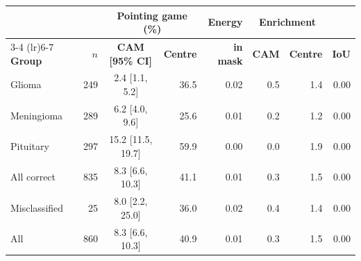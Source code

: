 \begin{tabular}{l r c r r r r r}
\toprule
 & & \multicolumn{2}{c}{\textbf{Pointing game (\%)}} & \textbf{Energy} & \multicolumn{2}{c}{\textbf{Enrichment}} & \\
\cmidrule(lr){3-4} \cmidrule(lr){6-7}
\textbf{Group} & $n$ & \textbf{CAM [95\% CI]} & \textbf{Centre} & \textbf{in mask} & \textbf{CAM} & \textbf{Centre} & \textbf{IoU} \\
\midrule
Glioma & 249 & 2.4 [1.1, 5.2] & 36.5 & 0.02 & 0.5 & 1.4 & 0.00 \\
Meningioma & 289 & 6.2 [4.0, 9.6] & 25.6 & 0.01 & 0.2 & 1.2 & 0.00 \\
Pituitary & 297 & 15.2 [11.5, 19.7] & 59.9 & 0.00 & 0.0 & 1.9 & 0.00 \\
\midrule
All correct & 835 & 8.3 [6.6, 10.3] & 41.1 & 0.01 & 0.3 & 1.5 & 0.00 \\
Misclassified & 25 & 8.0 [2.2, 25.0] & 36.0 & 0.02 & 0.4 & 1.4 & 0.00 \\
All & 860 & 8.3 [6.6, 10.3] & 40.9 & 0.01 & 0.3 & 1.5 & 0.00 \\
\bottomrule
\end{tabular}
